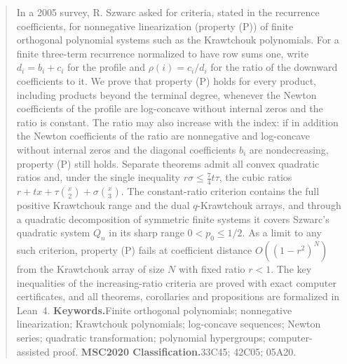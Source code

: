 \newcommand{\papertitle}{Log-concavity criteria for finite nonnegative linearization}
\newcommand{\papershort}{LOG-CONCAVITY CRITERIA FOR FINITE LINEARIZATION}
\newcommand{\paperdate}{November 6, 2026}

\usepackage{tikz}
\theoremstyle{slbody}
\newtheorem*{mainthm}{Theorem~A}
\newtheorem*{mainthmB}{Theorem~B}

\maketitle

\begin{abstract}
In a 2005 survey, R. Szwarc asked for criteria, stated in the recurrence coefficients, for nonnegative linearization (property (P)) of finite orthogonal polynomial systems such as the Krawtchouk polynomials. For a finite three-term recurrence normalized to have row sums one, write $d_i=b_i+c_i$ for the profile and $\rho(i)=c_i/d_i$ for the ratio of the downward coefficients to it. We prove that property (P) holds for every product, including products beyond the terminal degree, whenever the Newton coefficients of the profile are log-concave without internal zeros and the ratio is constant. The ratio may also increase with the index: if in addition the Newton coefficients of the ratio are nonnegative and log-concave without internal zeros and the diagonal coefficients $b_i$ are nondecreasing, property (P) still holds. Separate theorems admit all convex quadratic ratios and, under the single inequality $r\sigma\leq\frac74t\tau$, the cubic ratios $r+tx+\tau\binom x2+\sigma\binom x3$. The constant-ratio criterion contains the full positive Krawtchouk range and the dual $q$-Krawtchouk arrays, and through a quadratic decomposition of symmetric finite systems it covers Szwarc's quadratic system $Q_n$ in its sharp range $0<p_0\leq1/2$. As a limit to any such criterion, property (P) fails at coefficient distance $O((1-r^2)^N)$ from the Krawtchouk array of size $N$ with fixed ratio $r<1$. The key inequalities of the increasing-ratio criteria are proved with exact computer certificates, and all theorems, corollaries and propositions are formalized in Lean~4.
\vskip5pt
\noindent\textbf{Keywords.}\enspace Finite orthogonal polynomials; nonnegative linearization; Krawtchouk polynomials; log-concave sequences; Newton series; quadratic transformation; polynomial hypergroups; computer-assisted proof.
\vskip5pt
\noindent\textbf{MSC2020 Classification.}\enspace 33C45; 42C05; 05A20.
\end{abstract}

